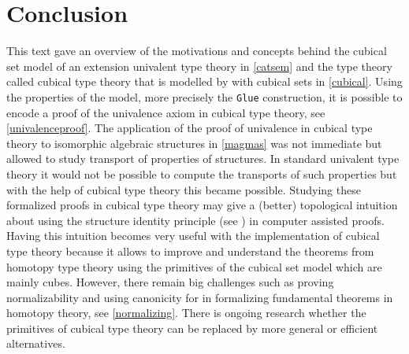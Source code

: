 \documentclass[12pt,a4paper,twoside,xetex]{book}
\begin{document}
\chapter*{Conclusion}

This text gave an overview of the motivations and concepts behind the cubical set model of an extension univalent type theory in \cref{catsem} and the type theory called cubical type theory that is modelled by with cubical sets in \cref{cubical}. Using the properties of the model, more precisely the \texttt{Glue} construction, it is possible to encode a proof of the univalence axiom in cubical type theory, see \cref{univalenceproof}. The application of the proof of univalence in cubical type theory to isomorphic algebraic structures in \cref{magmas} was not immediate but allowed to study transport of properties of structures. In standard univalent type theory it would not be possible to compute the transports of such properties but with the help of cubical type theory this became possible. Studying these formalized proofs in cubical type theory may give a (better) topological intuition about using the structure identity principle (see \cite{Aczel2012}) in computer assisted proofs. Having this intuition becomes very useful with the implementation of cubical type theory because it allows to improve and understand the theorems from homotopy type theory using the primitives of the cubical set model which are mainly cubes. However, there remain big challenges such as proving normalizability and using canonicity for in formalizing fundamental theorems in homotopy theory, see \cref{normalizing}. There is ongoing research whether the primitives of cubical type theory can be replaced by more general or efficient alternatives.





\clearpage
{}
\printindex

\newpage



\newpage
\thispagestyle{empty}
\end{document}

